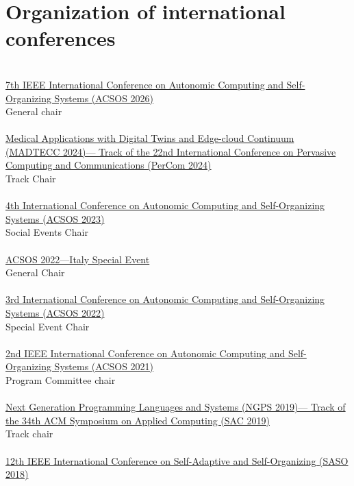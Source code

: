 \section{{\color{black}Organization of international conferences}}
\halfblankline \\
\href{https://2026.acsos.org/}{7th IEEE International Conference on Autonomic Computing and Self-Organizing Systems
(ACSOS 2026)}
\\ General chair \\
\halfblankline \\
\href{https://madtecc.github.io/}{Medical Applications with Digital Twins and Edge-cloud Continuum (MADTECC 2024)---%
Track of the 22nd International Conference on Pervasive Computing and Communications (PerCom 2024)}
\\ Track Chair \\
\halfblankline \\
\href{https://conf.researchr.org/home/acsos-2023/}{4th International Conference on Autonomic Computing and Self-Organizing Systems
(ACSOS 2023)}
\\ Social Events Chair \\
\halfblankline \\
\href{https://2022.acsos.org/track/acsos-2022-special-events\#acsos-italy-special-event}{ACSOS 2022---Italy Special Event}
\\ General Chair \\
\halfblankline \\
\href{https://conf.researchr.org/home/acsos-2022/}{3rd International Conference on Autonomic Computing and Self-Organizing Systems
    (ACSOS 2022)}
\\ Special Event Chair \\
\halfblankline \\
\href{https://conf.researchr.org/home/acsos-2021}{2nd IEEE International Conference on Autonomic Computing and Self-Organizing Systems
(ACSOS 2021)}
\\ Program Committee chair \\
\halfblankline \\
\href{https://ngps2019.github.io/}{Next Generation Programming Languages and Systems (NGPS 2019)---%
Track of the 34th ACM Symposium on Applied Computing (SAC 2019)}
\\ Track chair \\
\halfblankline \\
\href{https://saso2018.fbk.eu/}{12th IEEE International Conference on Self-Adaptive and Self-Organizing (SASO 2018)}
